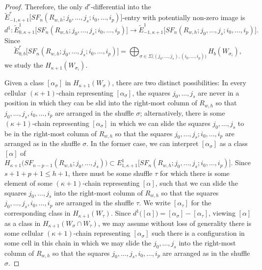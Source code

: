 \documentclass[pagebackref,colorlinks,citecolor=blue,linkcolor=blue,urlcolor=blue,filecolor=blue]{article}
\theoremstyle{definition}\newtheorem{definition}[thm]{Definition}
\theoremstyle{definition}
\begin{document}
\begin{proof}
Therefore, the only $d^{r}$-differential into the $\tilde{E}^{r}_{-1,\kappa+1}\big[SF_{n}(R_{w, h};j_{0}, \dots, j_{s};i_{0},\dots, i_{p})\big]$-entry with potentially non-zero image is
\[
d^{1}:\tilde{E}^{1}_{0,\kappa+1}\big[SF_{n}(R_{w, h};j_{0}, \dots, j_{s};i_{0},\dots, i_{p})\big] \to \tilde{E}^{1}_{-1,\kappa+1}\big[SF_{n}(R_{w, h};j_{0}, \dots, j_{s};i_{0},\dots, i_{p})\big].
\]
Since
\[
\tilde{E}^{r}_{0,b}\big[SF_{n}(R_{w, h};j_{0}, \dots, j_{s};i_{0},\dots, i_{p})\big]=\bigoplus_{\sigma\in\Sigma\big((j_{0},\dots, j_{s}), (i_{0},\dots, i_{p})\big)}H_{b}(W_{\sigma_{i}}),
\]
we study the $H_{\kappa+1}(W_{\sigma_{i}})$.

Given a class $[\alpha_{\sigma}]$ in $H_{\kappa+1}(W_{\sigma})$, there are two distinct possibilities: In every cellular $(\kappa+1)$-chain representing $[\alpha_{\sigma}]$, the squares $j_{0}, \dots, j_{s}$ are never in a position in which they can be slid into the right-most column of $R_{w, h}$ so that $j_{0}, \dots, j_{s}, i_{0}, \dots, i_{p}$ are arranged in the shuffle $\sigma$; alternatively, there is some $(\kappa+1)$-chain representing $[\alpha_{\sigma}]$ in which we can slide the squares $j_{0}, \dots, j_{s}$ to be in the right-most column of $R_{w, h}$ so that the squares $j_{0}, \dots, j_{s};i_{0},\dots, i_{p}$ are arranged as in the shuffle $\sigma$.
In the former case, we can interpret $[\alpha_{\sigma}]$ as a class $[\alpha]$ of $H_{\kappa+1}\big(SF_{n-p-1}(R_{w, h}; j_{0}, \dots, j_{s})\big)\subset E^{1}_{1, \kappa+1}\big[SF_{n}(R_{w, h};j_{0}, \dots, j_{s};i_{0},\dots, i_{p})\big]$.
Since $s+1+p+1\le h+1$, there must be some shuffle $\tau$ for which there is some element of some $(\kappa+1)$-chain representing $[\alpha]$, such that we can slide the squares $j_{0}, \dots, j_{s}$ into the right-most column of $R_{w, h}$ so that the squares $j_{0}, \dots, j_{s}, i_{0}, \dots, i_{p}$ are arranged in the shuffle $\tau$.
We write $[\alpha_{\tau}]$ for the corresponding class in $H_{\kappa+1}(W_{\tau})$.
Since $d^{1}\big([\alpha]\big)=[\alpha_{\sigma}]-[\alpha_{\tau}]$, viewing $[\alpha]$ as a class in $H_{\kappa+1}(W_{\sigma}\cap W_{\tau})$, we may assume without loss of generality there is some cellular $(\kappa+1)$-chain representing $[\alpha_{\sigma}]$ such there is a configuration in some cell in this chain in which we may slide the $j_{0}, \dots, j_{s}$ into the right-most column of $R_{w, h}$ so that the squares $j_{0}, \dots, j_{s}, i_{0}, \dots, i_{p}$ are arranged as in the shuffle $\sigma$.


\end{proof}
\end{document}

